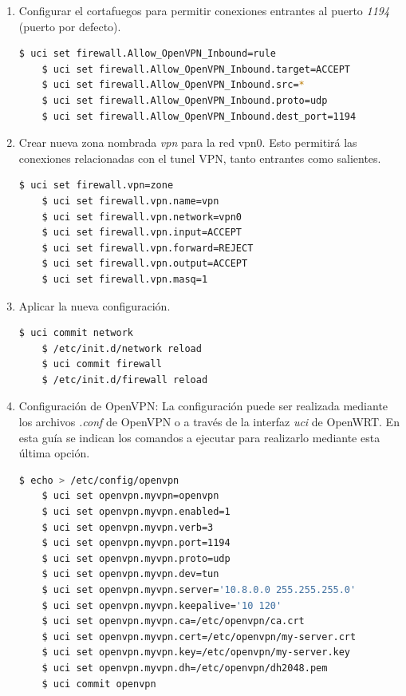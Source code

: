 \documentclass[12pt, twoside]{article}
\begin{document}
\begin{enumerate}
\begin{enumerate}
                        \item Configurar el cortafuegos para permitir conexiones entrantes al puerto \textit{1194} (puerto por defecto).

                        \begin{lstlisting}[language=bash]
    $ uci set firewall.Allow_OpenVPN_Inbound=rule
    $ uci set firewall.Allow_OpenVPN_Inbound.target=ACCEPT
    $ uci set firewall.Allow_OpenVPN_Inbound.src=*
    $ uci set firewall.Allow_OpenVPN_Inbound.proto=udp
    $ uci set firewall.Allow_OpenVPN_Inbound.dest_port=1194    
                        \end{lstlisting}

                        \item Crear nueva zona nombrada \textit{vpn} para la red vpn0. Esto permitirá las conexiones relacionadas con el tunel VPN, tanto entrantes como salientes.

                        \begin{lstlisting}[language=bash]
    $ uci set firewall.vpn=zone
    $ uci set firewall.vpn.name=vpn
    $ uci set firewall.vpn.network=vpn0
    $ uci set firewall.vpn.input=ACCEPT
    $ uci set firewall.vpn.forward=REJECT
    $ uci set firewall.vpn.output=ACCEPT
    $ uci set firewall.vpn.masq=1
                        \end{lstlisting}

                        \item Aplicar la nueva configuración.

                        \begin{lstlisting}[language=bash]
    $ uci commit network
    $ /etc/init.d/network reload
    $ uci commit firewall
    $ /etc/init.d/firewall reload  
                        \end{lstlisting}

                        \item Configuración de OpenVPN:
                        La configuración puede ser realizada mediante los archivos \textit{.conf} de OpenVPN o a través de la interfaz \textit{uci} de OpenWRT. En esta guía se indican los comandos a ejecutar para realizarlo mediante esta última opción.

                        \begin{lstlisting}[language=bash]
    $ echo > /etc/config/openvpn
    $ uci set openvpn.myvpn=openvpn
    $ uci set openvpn.myvpn.enabled=1
    $ uci set openvpn.myvpn.verb=3
    $ uci set openvpn.myvpn.port=1194
    $ uci set openvpn.myvpn.proto=udp
    $ uci set openvpn.myvpn.dev=tun
    $ uci set openvpn.myvpn.server='10.8.0.0 255.255.255.0'
    $ uci set openvpn.myvpn.keepalive='10 120'
    $ uci set openvpn.myvpn.ca=/etc/openvpn/ca.crt
    $ uci set openvpn.myvpn.cert=/etc/openvpn/my-server.crt
    $ uci set openvpn.myvpn.key=/etc/openvpn/my-server.key
    $ uci set openvpn.myvpn.dh=/etc/openvpn/dh2048.pem
    $ uci commit openvpn
                        \end{lstlisting}


\end{enumerate}
\end{enumerate}
\end{document}
